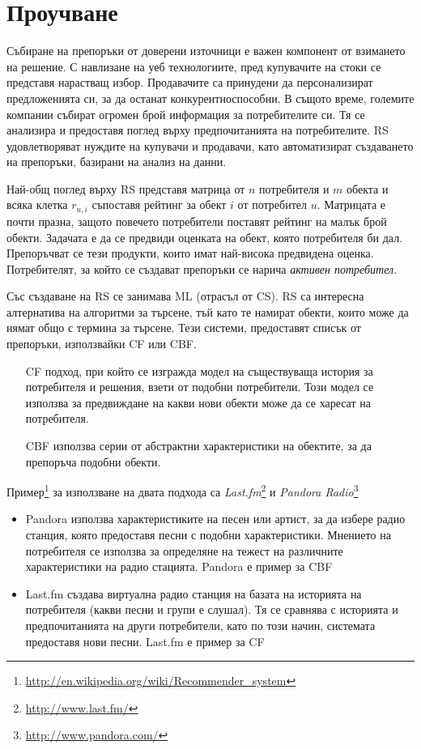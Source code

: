 \section{Проучване}

	Събиране на препоръки от доверени източници е важен компонент от взимането на решение. С навлизане на уеб технологиите, пред купувачите на стоки се представя нарастващ избор. Продавачите са принудени да персонализират предложенията си, за да останат конкурентноспособни. В същото време, големите компании събират огромен брой информация за потребителите си. Тя се анализира и предоставя поглед върху предпочитанията на потребителите. \ac{RS} удовлетворяват нуждите на купувачи и продавачи, като автоматизират създаването на препоръки, базирани на анализ на данни.
	
	Най-общ поглед върху \ac{RS} представя матрица от $n$ потребителя и $m$ обекта и всяка клетка $r_{u,i}$ съпоставя рейтинг за обект $i$ от потребител $u$. Матрицата е почти празна, защото повечето потребители поставят рейтинг на малък брой обекти. Задачата е да се предвиди оценката на обект, която потребителя би дал. Препоръчват се тези продукти, които имат най-висока предвидена оценка. Потребителят, за който се създават препоръки се нарича \emph{активен потребител}.

	Със създаване на \ac{RS} се занимава \ac{ML} (отрасъл от \ac{CS}). \ac{RS} са интересна алтернатива на алгоритми за търсене, тъй като те намират обекти, които може да нямат общо с термина за търсене. Тези системи, предоставят списък от препоръки, използвайки \ac{CF} или \ac{CBF}. 
	
	\begin{itemize}
		\item[\ac{CF}] подход, при който се изгражда модел на съществуваща история за потребителя и решения, взети от подобни потребители.
	Този модел се използва за предвиждане на какви нови обекти може да се харесат на потребителя.\cite{Melville}
		\item[\ac{CBF}] използва серии от абстрактни характеристики на обектите, за да препоръча подобни обекти.\cite{Mooney}
	\end{itemize}
	
	Пример\footnote{\url{http://en.wikipedia.org/wiki/Recommender_system}} за използване на двата подхода са 
  \emph{Last.fm}\footnote{\url{http://www.last.fm/}} и \emph{Pandora Radio}\footnote{\url{http://www.pandora.com/}}
  
  \begin{itemize}
		\item Pandora използва характеристиките на песен или артист, за да избере радио станция, която предоставя песни с подобни характеристики. Мнението на потребителя се използва за определяне на тежест на различните характеристики на радио стацията. Pandora е пример за \ac{CBF}
		\item Last.fm създава виртуална радио станция на базата на историята на потребителя (какви песни и групи е слушал). Тя се сравнява с историята и предпочитанията на други потребители, като по този начин, системата предоставя нови песни. Last.fm е пример за \ac{CF}
  \end{itemize}

